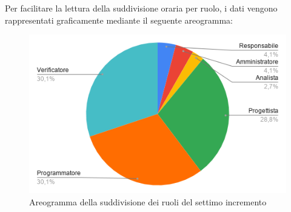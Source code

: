 \documentclass[../piano-di-progetto.tex]{subfiles}
\begin{document}
  Per facilitare la lettura della suddivisione oraria per ruolo, i dati vengono rappresentati graficamente mediante il seguente areogramma:
  \begin{figure}[H]
    \centering
    \includegraphics[width=12cm]{img/ruoli-7-incr.png}
    \caption{Areogramma della suddivisione dei ruoli del settimo  incremento}
    \label{fig:ore-ruolo-progettazione}
  \end{figure}
\end{document}
